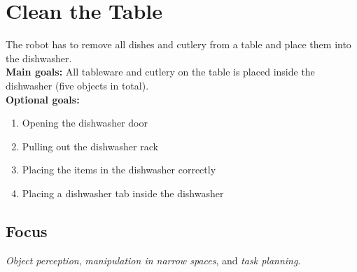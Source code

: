 \section{Clean the Table}
\label{test:clean-the-table}
The robot has to remove all dishes and cutlery from a table and place them into the dishwasher.\\

\noindent \textbf{Main goals:} All tableware and cutlery on the table is placed inside the dishwasher (five objects in total).\\

\noindent \textbf{Optional goals:}
\begin{enumerate}[nosep]
	\item Opening the dishwasher door
	\item Pulling out the dishwasher rack
	\item Placing the items in the dishwasher correctly
	\item Placing a dishwasher tab inside the dishwasher
\end{enumerate}

\subsection*{Focus}
\emph{Object perception}, \emph{manipulation in narrow spaces}, and \emph{task planning}.

